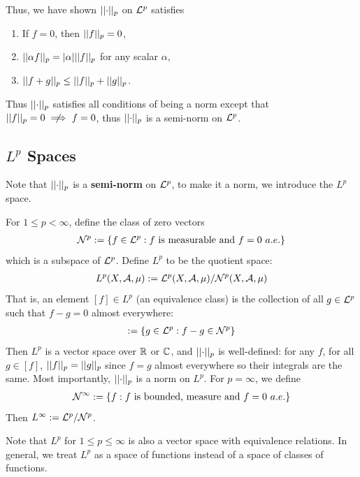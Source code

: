 \documentclass[11pt]{article}
\begin{document}
	Thus, we have shown $\vert \vert {\cdot} \vert \vert_p$ on $\mathcal{{L}}^p$ satisfies
	\begin{enumerate}
		\item If $f = 0$, then $\vert \vert {f} \vert \vert_p = 0$,
		\item $\vert \vert {\alpha f} \vert \vert_p = |\alpha|\vert \vert {f} \vert \vert_p$ for any scalar $\alpha$,
		\item $\vert \vert {f + g} \vert \vert_p \leq \vert \vert {f} \vert \vert_p + \vert \vert {g} \vert \vert_p$.
	\end{enumerate}
	Thus $\vert \vert {\cdot} \vert \vert_p$ satisfies all conditions of being a norm except that $\norm{f}_p = 0 \centernot \implies f = 0$, thus $\vert \vert {\cdot} \vert \vert_p$ is a semi-norm on $\mathcal{{L}}^p$.
	
	\subsection{$L^p$ Spaces}
	Note that $\vert \vert {\cdot} \vert \vert_p$ is a \textbf{semi-norm} on $\mathcal{{L}}^p$, to make it a norm, we introduce the $L^p$ space.
	\begin{definition}
		For $1 \leq p < \infty$, define the class of zero vectors
		\begin{align}
			\mathcal{{N}}^p := \{f \in \mathcal{{L}}^p : f \text{{ is measurable and }} f = 0\ a.e.\}
		\end{align}
		which is a subspace of $\mathcal{{L}}^p$. Define $L^p$ to be the quotient space:
		\begin{align}
			L^p(X, \mathcal{{A}}, \mu) := \mathcal{{L}}^p(X, \mathcal{{A}}, \mu) / \mathcal{{N}}^p(X, \mathcal{{A}}, \mu)
		\end{align}
		That is, an element $[f] \in L^p$ (an equivalence class) is the collection of all $g \in \mathcal{{L}}^p$ such that $f - g = 0$ almost everywhere:
		\begin{align}
			[f] := \{g \in \mc{L}^p : f - g \in \mc{N}^p\}
		\end{align}
		Then $L^p$ is a vector space over $\mathbb{R}$ or $\mathbb{C}$, and $\vert \vert {\cdot} \vert \vert_p$ is well-defined: for any $f$, for all $g \in [f]$, $\vert \vert {f} \vert \vert_p = \vert \vert {g} \vert \vert_p$ since $f = g$ almost everywhere so their integrals are the same. Most importantly, $\vert \vert {\cdot} \vert \vert_p$ is a norm on $L^p$.
		For $p = \infty$, we define
		\begin{align}
			\mathcal{{N}}^\infty := \{f : f \text{{ is bounded, measure and }} f = 0\ a.e.\}
		\end{align}
		Then $L^\infty := \mathcal{{L}}^p / \mathcal{{N}}^p$.
	\end{definition}
	Note that $L^p$ for $1 \leq p \leq \infty$ is also a vector space with equivalence relations. In general, we treat $L^p$ as a space of functions instead of a space of classes of functions.
\end{document}
